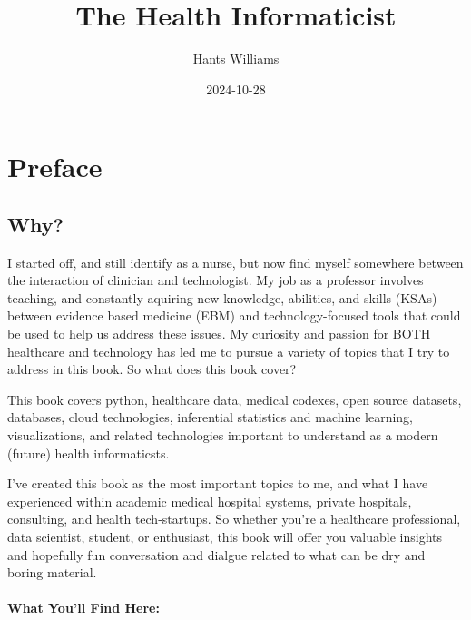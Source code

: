 \documentclass[
  letterpaper,
  DIV=11,
  numbers=noendperiod]{scrreprt}
\title{The Health Informaticist}
\author{Hants Williams}
\date{2024-10-28}
\renewcommand*\contentsname{Table of contents}
\newcommand\contentsname{Table of contents}
\theoremstyle{remark}
\begin{document}
\maketitle

\renewcommand*\contentsname{Table of contents}
{
\hypersetup{linkcolor=}
\setcounter{tocdepth}{2}
\tableofcontents
}


\chapter*{Preface}\label{preface}


\section*{Why?}\label{why}


I started off, and still identify as a nurse, but now find myself
somewhere between the interaction of clinician and technologist. My job
as a professor involves teaching, and constantly aquiring new knowledge,
abilities, and skills (KSAs) between evidence based medicine (EBM) and
technology-focused tools that could be used to help us address these
issues. My curiosity and passion for BOTH healthcare and technology has
led me to pursue a variety of topics that I try to address in this book.
So what does this book cover?

This book covers python, healthcare data, medical codexes, open source
datasets, databases, cloud technologies, inferential statistics and
machine learning, visualizations, and related technologies important to
understand as a modern (future) health informaticsts.

I've created this book as the most important topics to me, and what I
have experienced within academic medical hospital systems, private
hospitals, consulting, and health tech-startups. So whether you're a
healthcare professional, data scientist, student, or enthusiast, this
book will offer you valuable insights and hopefully fun conversation and
dialgue related to what can be dry and boring material.

\subsubsection*{What You'll Find Here:}\label{what-youll-find-here}
\end{document}
